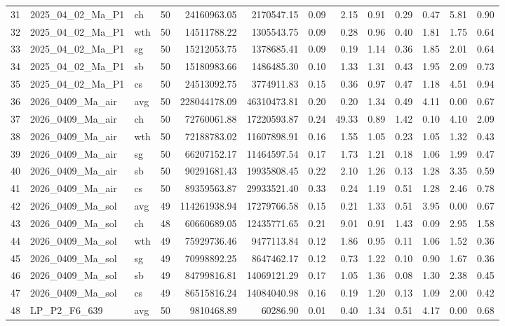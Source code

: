 \documentclass{article}
\begin{document}
\begin{table}[ht]
{\begin{tabular}{lllrrrrrrrrrr}
31 & 2025_04_02_Ma_P1 & ch & 50 & 24160963.05 & 2170547.15 & 0.09 & 2.15 & 0.91 & 0.29 & 0.47 & 5.81 & 0.90 \\
32 & 2025_04_02_Ma_P1 & wth & 50 & 14511788.22 & 1305543.75 & 0.09 & 0.28 & 0.96 & 0.40 & 1.81 & 1.75 & 0.64 \\
33 & 2025_04_02_Ma_P1 & sg & 50 & 15212053.75 & 1378685.41 & 0.09 & 0.19 & 1.14 & 0.36 & 1.85 & 2.01 & 0.64 \\
34 & 2025_04_02_Ma_P1 & sb & 50 & 15180983.66 & 1486485.30 & 0.10 & 1.33 & 1.31 & 0.43 & 1.95 & 2.09 & 0.73 \\
35 & 2025_04_02_Ma_P1 & cs & 50 & 24513092.75 & 3774911.83 & 0.15 & 0.36 & 0.97 & 0.47 & 1.18 & 4.51 & 0.94 \\
36 & 2026_0409_Ma_air & avg & 50 & 228044178.09 & 46310473.81 & 0.20 & 0.20 & 1.34 & 0.49 & 4.11 & 0.00 & 0.67 \\
37 & 2026_0409_Ma_air & ch & 50 & 72760061.88 & 17220593.87 & 0.24 & 49.33 & 0.89 & 1.42 & 0.10 & 4.10 & 2.09 \\
38 & 2026_0409_Ma_air & wth & 50 & 72188783.02 & 11607898.91 & 0.16 & 1.55 & 1.05 & 0.23 & 1.05 & 1.32 & 0.43 \\
39 & 2026_0409_Ma_air & sg & 50 & 66207152.17 & 11464597.54 & 0.17 & 1.73 & 1.21 & 0.18 & 1.06 & 1.99 & 0.47 \\
40 & 2026_0409_Ma_air & sb & 50 & 90291681.43 & 19935808.45 & 0.22 & 2.10 & 1.26 & 0.13 & 1.28 & 3.35 & 0.59 \\
41 & 2026_0409_Ma_air & cs & 50 & 89359563.87 & 29933521.40 & 0.33 & 0.24 & 1.19 & 0.51 & 1.28 & 2.46 & 0.78 \\
42 & 2026_0409_Ma_sol & avg & 49 & 114261938.94 & 17279766.58 & 0.15 & 0.21 & 1.33 & 0.51 & 3.95 & 0.00 & 0.67 \\
43 & 2026_0409_Ma_sol & ch & 48 & 60660689.05 & 12435771.65 & 0.21 & 9.01 & 0.91 & 1.43 & 0.09 & 2.95 & 1.58 \\
44 & 2026_0409_Ma_sol & wth & 49 & 75929736.46 & 9477113.84 & 0.12 & 1.86 & 0.95 & 0.11 & 1.06 & 1.52 & 0.36 \\
45 & 2026_0409_Ma_sol & sg & 49 & 70998892.25 & 8647462.17 & 0.12 & 0.73 & 1.22 & 0.10 & 0.90 & 1.67 & 0.36 \\
46 & 2026_0409_Ma_sol & sb & 49 & 84799816.81 & 14069121.29 & 0.17 & 1.05 & 1.36 & 0.08 & 1.30 & 2.38 & 0.45 \\
47 & 2026_0409_Ma_sol & cs & 49 & 86515816.24 & 14084040.98 & 0.16 & 0.19 & 1.20 & 0.13 & 1.09 & 2.00 & 0.42 \\
48 & LP_P2_F6_639 & avg & 50 & 9810468.89 & 60286.90 & 0.01 & 0.40 & 1.34 & 0.51 & 4.17 & 0.00 & 0.68 \\

\end{tabular}}
\end{table}
\end{document}
